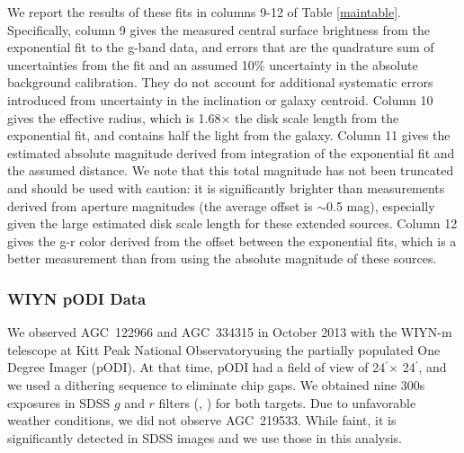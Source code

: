 \documentclass[twocolumn]{aastex6}
\def\arcmin{$^{\prime}$}
\begin{document}
We report the results of these fits in columns 9-12 of Table \ref{maintable}. Specifically, column 9 gives the measured central surface brightness from the exponential fit to the g-band data, and errors that are the quadrature sum of uncertainties from the fit and an assumed 10\% uncertainty in the absolute background calibration. They do not account for additional systematic errors introduced from uncertainty in the inclination or galaxy centroid. Column 10 gives the effective radius, which is 1.68$\times$ the disk scale length  from the exponential fit, and contains half the light from the galaxy. Column 11 gives the estimated absolute magnitude derived from integration of the exponential fit and the assumed distance. We note that this total magnitude has not been truncated and should be used with caution: it is significantly brighter than measurements derived from aperture magnitudes (the average offset is $\sim$0.5 mag), especially given the large estimated disk scale length for these extended sources. Column 12 gives the g-r color derived from the offset between the exponential fits, which is a better measurement than from using the absolute magnitude of these sources.   

\subsubsection{WIYN pODI Data}
\label{data.opt.podi}

We observed AGC~122966 and AGC~334315 in October 2013 with the WIYN-m telescope at Kitt Peak National Observatory\footnotemark[2] using the partially populated One
Degree Imager (pODI). At that time, pODI had a field of view of 24\arcmin $\times$
24\arcmin, and we used a dithering sequence to eliminate chip gaps. We
obtained nine 300s exposures in SDSS $g$ and $r$ filters (\citealp{gunn98a},
\citealp{doi10a}) for both 
targets. Due to unfavorable weather conditions, we did
not observe AGC~219533. While faint, it is significantly
detected in SDSS images and we use those in this analysis.


\end{document}
